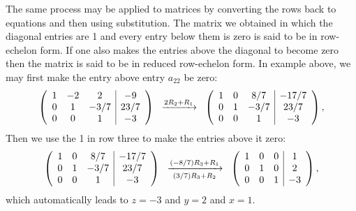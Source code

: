 \documentclass{ximera}
\begin{document}
\begin{example}
\begin{explanation}
The same process may be applied to matrices by converting the rows back to equations and then using substitution. The matrix we obtained in which the diagonal entries are 1 and every entry below them is zero is said to be in row-echelon form. If one also makes the entries above the diagonal to become zero then the matrix is said to be in reduced row-echelon form. In example above, we may first make the entry above entry $a_{22}$ be zero:
\[
\left(\begin{array}{ccc|c}
  1 &  -2 & 2 &-9 \\
  0 & 1 & -3/7 & 23/7 \\
  0 &  0 & 1 & -3
\end{array}\right)
\hspace{.2cm}\xrightarrow{2R_{2}+R_{1}} \hspace{.2cm}
\left(\begin{array}{ccc|c}
  1 &  0 & 8/7 &-17/7 \\
  0 & 1 & -3/7 & 23/7 \\
  0 &  0 & 1 & -3
\end{array}\right),
\]
Then we use the 1 in row three to make the entries above it zero:
\[
\left(\begin{array}{ccc|c}
  1 &  0 & 8/7 &-17/7 \\
  0 & 1 & -3/7 & 23/7 \\
  0 &  0 & 1 & -3
\end{array}\right)
\hspace{.2cm}\xrightarrow[(3/7)R_{3}+R_{2}]{(-8/7)R_{3}+R_{1}} \hspace{.2cm}
\left(\begin{array}{ccc|c}
  1 &  0 & 0 &1 \\
  0 & 1 & 0& 2 \\
  0 &  0 & 1 & -3
\end{array}\right),
\]
which automatically leads to $z=-3$ and $y=2$ and $x=1$.
\end{explanation}
\end{example}
\end{document}
